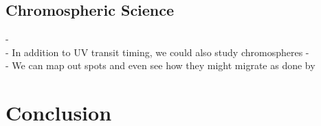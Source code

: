 \documentclass[manuscript]{aastex}
\begin{document}
\subsection{Chromospheric Science} \label{labl:cscience}
- \\
- In addition to UV transit timing, we could also study chromospheres
- \\
- We can map out spots and even see how they might migrate as done by \citet{2010arXiv1002.4113H}

\section{Conclusion}


  
\end{document}
